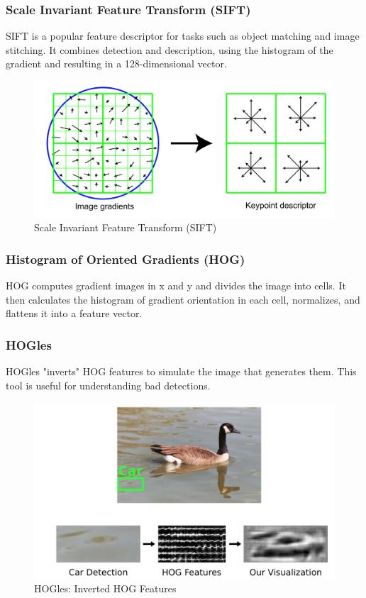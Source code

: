 \subsubsection{Scale Invariant Feature Transform (SIFT)}

SIFT is a popular feature descriptor for tasks such as object matching and image stitching.
It combines detection and description, using the histogram of the gradient and resulting in a 128-dimensional vector.

\begin{figure}[h]
	\centering
	\includegraphics[width=0.6\linewidth]{img/SIFT}
	\caption{Scale Invariant Feature Transform (SIFT)}
\end{figure}

\subsubsection{Histogram of Oriented Gradients (HOG)}

HOG computes gradient images in x and y and divides the image into cells.
It then calculates the histogram of gradient orientation in each cell, normalizes, and flattens it into a feature vector.

\subsubsection{HOGles}

HOGles "inverts" HOG features to simulate the image that generates them. This tool is useful for understanding bad detections.

\begin{figure}[h]
	\centering
	\includegraphics[width=0.6\linewidth]{img/HOGles}
	\caption{HOGles: Inverted HOG Features}
\end{figure}


